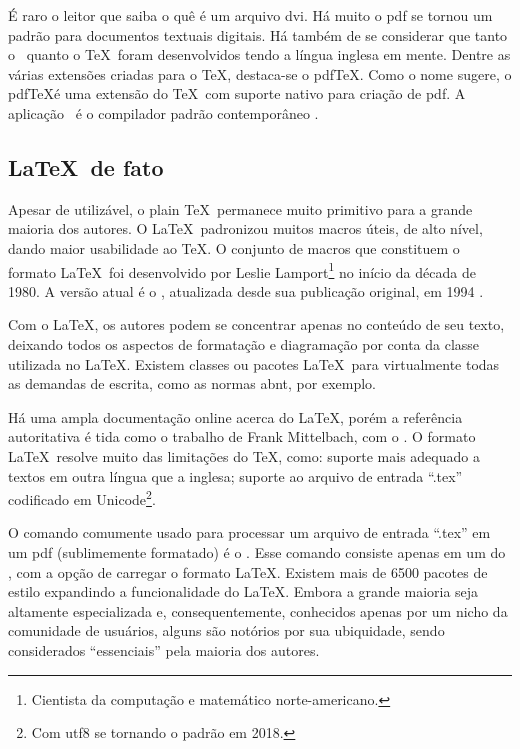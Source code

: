 É raro o leitor que saiba o quê é um arquivo \ac{dvi}. Há muito o \ac{pdf} se tornou um padrão  para documentos textuais digitais. Há também de se considerar que tanto o \tex\ quanto o \TeX\ foram desenvolvidos tendo a língua inglesa em mente. Dentre as várias extensões criadas para o \TeX, destaca-se o pdf\TeX. Como o nome sugere, o pdf\TeX é uma extensão do \TeX\ com suporte nativo para criação de \ac{pdf}. A aplicação \pdftex\ é o compilador padrão contemporâneo \cite{Thanh2024}.

\subsection{\LaTeX\ de fato}

Apesar de utilizável, o plain \TeX\ permanece muito primitivo para a grande maioria dos autores. O \LaTeX\ padronizou muitos macros úteis, de alto nível, dando maior usabilidade ao \TeX. O conjunto de macros que constituem o formato \LaTeX\ foi desenvolvido por Leslie Lamport\footnote{Cientista da computação e matemático norte-americano.} no início da década de 1980. A versão atual é o \LaTeXe, atualizada desde sua publicação original, em 1994 \cite{Lamport1994}.

Com o \LaTeX, os autores podem se concentrar apenas no conteúdo de seu texto, deixando todos os aspectos de formatação e diagramação por conta da classe utilizada no \LaTeX. Existem classes ou pacotes \LaTeX\ para virtualmente todas as demandas de escrita, como as normas \ac{abnt}, por exemplo.

Há uma ampla documentação online acerca do \LaTeX, porém a referência autoritativa é tida como o trabalho de Frank Mittelbach, com o  \cite{Mittelbach2023}. O formato \LaTeX\ resolve muito das limitações do \TeX, como: suporte mais adequado a textos em outra língua que a inglesa; suporte ao arquivo de entrada \enquote{.tex} codificado em Unicode\footnote{Com \ac{utf8} se tornando o padrão em 2018.}.

O comando comumente usado para processar um arquivo de entrada \enquote{.tex} em um \ac{pdf} (sublimemente formatado) é o \pdflatex. Esse comando consiste apenas em um  do \pdftex, com a opção de carregar o formato \LaTeX. Existem mais de 6500 pacotes de estilo expandindo a funcionalidade do \LaTeX. Embora a grande maioria seja altamente especializada e, consequentemente, conhecidos apenas por um nicho da comunidade de usuários, alguns são notórios por sua ubiquidade, sendo considerados \enquote{essenciais} pela maioria dos autores.


